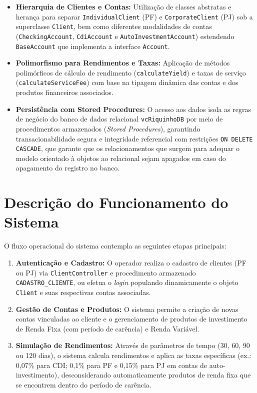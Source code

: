 \documentclass[12pt, a4paper]{article}
\begin{document}
	\begin{itemize}
		\item \textbf{Hierarquia de Clientes e Contas:} Utilização de classes abstratas e herança para separar \texttt{IndividualClient} (PF) e \texttt{CorporateClient} (PJ) sob a superclasse \texttt{Client}, bem como diferentes modalidades de contas (\texttt{CheckingAccount}, \texttt{CdiAccount} e \texttt{AutoInvestmentAccount}) estendendo \texttt{BaseAccount} que implementa a interface \texttt{Account}.
		\item \textbf{Polimorfismo para Rendimentos e Taxas:} Aplicação de métodos polimórficos de cálculo de rendimento (\texttt{calculateYield}) e taxas de serviço (\texttt{calculateServiceFee}) com base na tipagem dinâmica das contas e dos produtos financeiros associados.
		\item \textbf{Persistência com Stored Procedures:} O acesso aos dados isola as regras de negócio do banco de dados relacional \texttt{vcRiquinhoDB} por meio de procedimentos armazenados (\textit{Stored Procedures}), garantindo transacionabilidade segura e integridade referencial com restrições \texttt{ON DELETE CASCADE}, que garante que os relacionamentos que surgem para adequar o modelo orientado à objetos ao relacional sejam apagados em caso do apagamento do registro no banco.
	\end{itemize}
	
	\section{Descrição do Funcionamento do Sistema}
	O fluxo operacional do sistema contempla as seguintes etapas principais:
	\begin{enumerate}
		\item \textbf{Autenticação e Cadastro:} O operador realiza o cadastro de clientes (PF ou PJ) via \texttt{ClientController} e procedimento armazenado \texttt{CADASTRO\_CLIENTE}, ou efetua o \textit{login} populando dinamicamente o objeto \texttt{Client} e suas respectivas contas associadas.
		\item \textbf{Gestão de Contas e Produtos:} O sistema permite a criação de novas contas vinculadas ao cliente e o gerenciamento de produtos de investimento de Renda Fixa (com período de carência) e Renda Variável.
		\item \textbf{Simulação de Rendimentos:} Através de parâmetros de tempo (30, 60, 90 ou 120 dias), o sistema calcula rendimentos e aplica as taxas específicas (ex.: 0,07\% para CDI; 0,1\% para PF e 0,15\% para PJ em contas de auto-investimento), desconsiderando automaticamente produtos de renda fixa que se encontrem dentro do período de carência.
	\end{enumerate}
	
\end{document}

